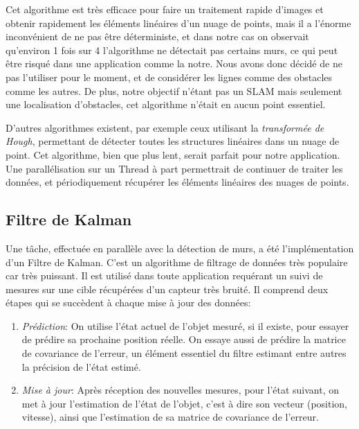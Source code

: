 Cet algorithme est très efficace pour faire un traitement rapide d'images et obtenir rapidement les éléments linéaires d'un nuage de points, mais il a l'énorme inconvénient de ne pas être déterministe, et dans notre cas on observait qu'environ 1 fois sur 4 l'algorithme ne détectait pas certains murs, ce qui peut être risqué dans une application comme la notre. Nous avons donc décidé de ne pas l'utiliser pour le moment, et de considérer les lignes comme des obstacles comme les autres. De plus, notre objectif n'étant pas un SLAM mais seulement une localisation d'obstacles, cet algorithme n'était en aucun point essentiel.

D'autres algorithmes existent, par exemple ceux utilisant la \textit{transformée de Hough}, permettant de détecter toutes les structures linéaires dans un nuage de point. Cet algorithme, bien que plus lent, serait parfait pour notre application. Une parallélisation sur un Thread à part permettrait de continuer de traiter les données, et périodiquement récupérer les éléments linéaires des nuages de points.

\subsection{Filtre de Kalman}
\tab Une tâche, effectuée en parallèle avec la détection de murs, a été l'implémentation d'un Filtre de Kalman. C'est un algorithme de filtrage de données très populaire car très puissant. Il est utilisé dans toute application requérant un suivi de mesures sur une cible récupérées d'un capteur très bruité.
Il comprend deux étapes qui se succèdent à chaque mise à jour des données:
\tab \begin{enumerate}
            \item \textit{Prédiction}: On utilise l'état actuel de l'objet mesuré, si il existe, pour essayer de prédire sa prochaine position réelle. On essaye aussi de prédire la matrice de covariance de l'erreur, un élément essentiel du filtre estimant entre autres la précision de l'état estimé.
            \item \textit{Mise à jour}: Après réception des nouvelles mesures, pour l'état suivant, on met à jour l'estimation de l'état de l'objet, c'est à dire son vecteur (position, vitesse), ainsi que l'estimation de sa matrice de covariance de l'erreur.
        \end{enumerate}
        
